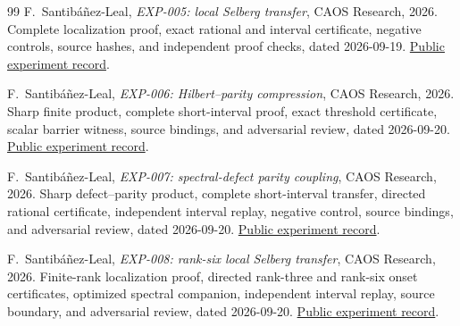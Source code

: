﻿\documentclass[11pt]{article}
\theoremstyle{remark}
\begin{document}
\begin{thebibliography}{99}
F.~Santib\'a\~nez-Leal,
\emph{EXP-005: local Selberg transfer}, CAOS Research, 2026.
Complete localization proof, exact rational and interval certificate,
negative controls, source hashes, and independent proof checks, dated
2026-09-19.
\href{https://github.com/fsantibanezleal/CAOS_RESEARCH/tree/main/problems/number-theory/riemann-hypothesis/experiments/EXP-005-local-selberg-transfer}{Public experiment record}.

F.~Santib\'a\~nez-Leal,
\emph{EXP-006: Hilbert--parity compression}, CAOS Research, 2026.
Sharp finite product, complete short-interval proof, exact threshold
certificate, scalar barrier witness, source bindings, and adversarial review,
dated 2026-09-20.
\href{https://github.com/fsantibanezleal/CAOS_RESEARCH/tree/main/problems/number-theory/riemann-hypothesis/experiments/EXP-006-hilbert-parity-compression}{Public experiment record}.

F.~Santib\'a\~nez-Leal,
\emph{EXP-007: spectral-defect parity coupling}, CAOS Research, 2026.
Sharp defect--parity product, complete short-interval transfer, directed
rational certificate, independent interval replay, negative control, source
bindings, and adversarial review, dated 2026-09-20.
\href{https://github.com/fsantibanezleal/CAOS_RESEARCH/tree/main/problems/number-theory/riemann-hypothesis/experiments/EXP-007-spectral-defect-parity}{Public experiment record}.

F.~Santib\'a\~nez-Leal,
\emph{EXP-008: rank-six local Selberg transfer}, CAOS Research, 2026.
Finite-rank localization proof, directed rank-three and rank-six onset
certificates, optimized spectral companion, independent interval replay,
source boundary, and adversarial review, dated 2026-09-20.
\href{https://github.com/fsantibanezleal/CAOS_RESEARCH/tree/main/problems/number-theory/riemann-hypothesis/experiments/EXP-008-rank-six-local-transfer}{Public experiment record}.

\end{thebibliography}
\end{document}
